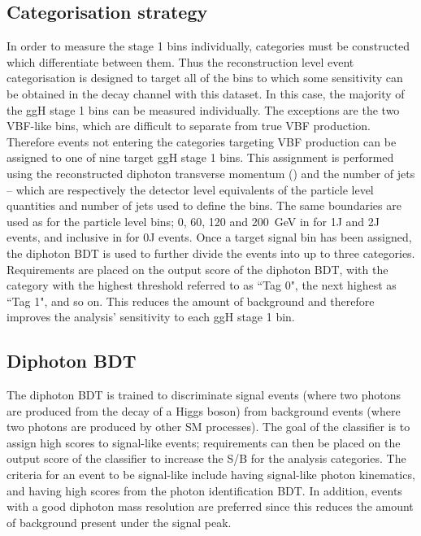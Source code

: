 \subsection{Categorisation strategy}

In order to measure the stage 1 bins individually, 
categories must be constructed which differentiate between them.
Thus the reconstruction level event categorisation is designed to target all of the bins 
to which some sensitivity can be obtained in the \Hgg decay channel with this dataset.
In this case, the majority of the ggH stage 1 bins can be measured individually. 
The exceptions are the two VBF-like bins, 
which are difficult to separate from true VBF production.
Therefore events not entering the categories targeting VBF production 
can be assigned to one of nine target ggH stage 1 bins.
This assignment is performed using the reconstructed 
diphoton transverse momentum (\ptgg) and the number of jets -- 
which are respectively the detector level equivalents 
of the particle level quantities \ptH and number of jets used to define the bins.
The same boundaries are used as for the particle level bins; 
0, 60, 120 and \SI{200}{GeV} in \ptgg for 1J and 2J events, 
and inclusive in \ptgg for 0J events.
Once a target signal bin has been assigned, 
the diphoton BDT is used to further divide the events into up to three categories.
Requirements are placed on the output score of the diphoton BDT, 
with the category with the highest threshold referred to as ``Tag 0", 
the next highest as ``Tag 1", and so on.
This reduces the amount of background 
and therefore improves the analysis' sensitivity to each ggH stage 1 bin.

\subsection{Diphoton BDT}

The diphoton BDT is trained to discriminate signal events 
(where two photons are produced from the decay of a Higgs boson) from background events 
(where two photons are produced by other SM processes).
The goal of the classifier is to assign high scores to signal-like events;
requirements can then be placed on the output score of the classifier 
to increase the S/B for the analysis categories.
The criteria for an event to be signal-like include having signal-like photon kinematics, 
and having high scores from the photon identification BDT.
In addition, events with a good diphoton mass resolution are preferred 
since this reduces the amount of background present under the signal peak.

